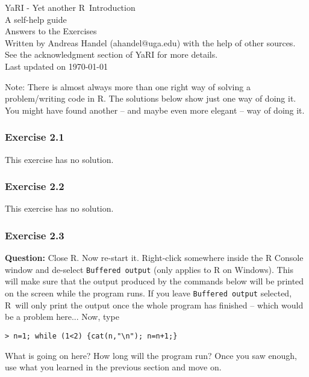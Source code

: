 \documentclass [11pt]{article}
\newcommand{\code}[1]{{\tt #1}}
\newcommand\R{{\sf R}}
\begin{document}
\begin{center}
\Large YaRI - Yet another \R\ Introduction\\
A self-help guide\\
\vspace{0.25in}
Answers to the Exercises\\
\vspace{0.25in}
\large  
Written by Andreas Handel (ahandel@uga.edu) with the help of other sources. \\
See the acknowledgment section of YaRI for more details.\\
\normalsize 
\vspace{0.25in}
Last updated on \today \\
\vspace{0.25in}
\end{center}

Note: There is almost always more than one right way of solving a problem/writing code in \R. The solutions below show just one way of doing it. You might have found another -- and maybe even more elegant -- way of doing it.

\subsubsection*{Exercise 2.1}
This exercise has no solution.

\subsubsection*{Exercise 2.2}
This exercise has no solution.

\subsubsection*{Exercise 2.3}
\textbf{Question:} Close \R. Now re-start it. Right-click somewhere inside the R Console window and de-select \code{Buffered output} (only applies to R on Windows). This will make sure that the output produced by the commands below will be printed on the screen while the program runs. If you leave \code{Buffered output} selected, \R\ will only print the output once the whole program has finished -- which would be a problem here... Now, type  
\vspace{-0.1in}
\begin{verbatim}
> n=1; while (1<2) {cat(n,"\n"); n=n+1;}
\end{verbatim}
\vspace{-0.1in}
What is going on here? How long will the program run? Once you saw enough, use what you learned in the previous section and move on.
\end{document}

